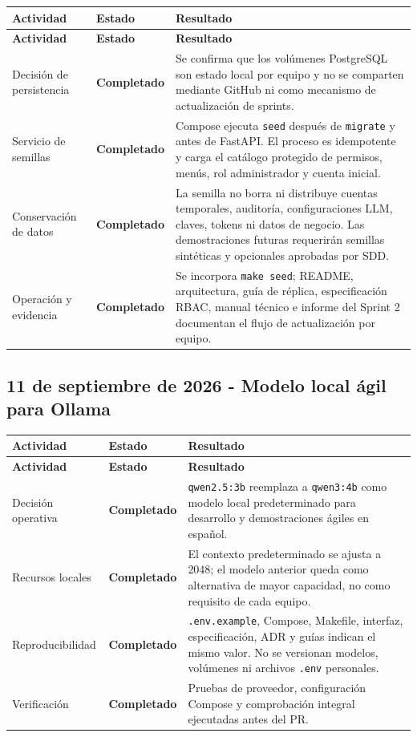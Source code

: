 \documentclass[11pt,letterpaper]{article}
\newcommand{\statusok}{\textcolor{deepgreen}{\textbf{Completado}}}
\newcommand{\file}[1]{\texttt{#1}}
\begin{document}
\begin{longtable}{@{}p{}p{}p{}@{}}
  \toprule
  \textbf{Actividad} & \textbf{Estado} & \textbf{Resultado} \\
  \midrule
  \endfirsthead
  \toprule
  \textbf{Actividad} & \textbf{Estado} & \textbf{Resultado} \\
  \midrule
  \endhead
  Decisión de persistencia & \statusok & Se confirma que los volúmenes PostgreSQL son estado local por equipo y no se comparten mediante GitHub ni como mecanismo de actualización de sprints. \\
  Servicio de semillas & \statusok & Compose ejecuta \file{seed} después de \file{migrate} y antes de FastAPI. El proceso es idempotente y carga el catálogo protegido de permisos, menús, rol administrador y cuenta inicial. \\
  Conservación de datos & \statusok & La semilla no borra ni distribuye cuentas temporales, auditoría, configuraciones LLM, claves, tokens ni datos de negocio. Las demostraciones futuras requerirán semillas sintéticas y opcionales aprobadas por SDD. \\
  Operación y evidencia & \statusok & Se incorpora \file{make seed}; README, arquitectura, guía de réplica, especificación RBAC, manual técnico e informe del Sprint 2 documentan el flujo de actualización por equipo. \\
  \bottomrule
\end{longtable}

\subsection{11 de septiembre de 2026 - Modelo local ágil para Ollama}

\begin{longtable}{@{}p{}p{}p{}@{}}
  \toprule
  \textbf{Actividad} & \textbf{Estado} & \textbf{Resultado} \\
  \midrule
  \endfirsthead
  \toprule
  \textbf{Actividad} & \textbf{Estado} & \textbf{Resultado} \\
  \midrule
  \endhead
  Decisión operativa & \statusok & \file{qwen2.5:3b} reemplaza a \file{qwen3:4b} como modelo local predeterminado para desarrollo y demostraciones ágiles en español. \\
  Recursos locales & \statusok & El contexto predeterminado se ajusta a 2048; el modelo anterior queda como alternativa de mayor capacidad, no como requisito de cada equipo. \\
  Reproducibilidad & \statusok & \file{.env.example}, Compose, Makefile, interfaz, especificación, ADR y guías indican el mismo valor. No se versionan modelos, volúmenes ni archivos \file{.env} personales. \\
  Verificación & \statusok & Pruebas de proveedor, configuración Compose y comprobación integral ejecutadas antes del PR. \\
  \bottomrule
\end{longtable}
\end{document}
